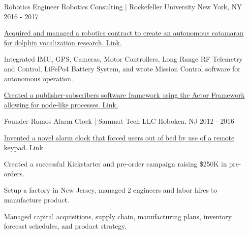 \begin{cventries}
  \cventry
    {Robotics Engineer} %
    {Robotics Consulting | Rockefeller University} %
    {New York, NY} %
    {2016 - 2017} %
    {
      \begin{cvitems} %
          \item {\href{https://paulsammut.com/doku.php/robodolf}
            {Acquired and managed a robotics contract to create an autonomous catamaran for dolphin vocalization research. \color{darkblue}Link.}}
        \item {Integrated IMU, GPS, Cameras, Motor Controllers, Long Range RF Telemetry and Control, 
                    LiFePo4 Battery System, and wrote Mission Control software for autonomous operation.}
        \item {\href{http://bit.ly/2BSBD1c}{Created a publisher-subscribers
            software framework using the Actor Framework allowing for node-like processes. \color{darkblue}Link.}}
      \end{cvitems}
    }

  \cventry
    {Founder} %
    {Ramos Alarm Clock | Sammut Tech LLC} %
    {Hoboken, NJ} %
    {2012 - 2016} %
    {
      \begin{cvitems} %
        \item {\href{http://bit.ly/2NvLgHA}{Invented a novel alarm clock that forced users out of bed by use of a remote keypad. \color{darkblue}Link.}}
        \item {Created a successful Kickstarter and pre-order campaign raising \$250K in pre-orders.}
        \item {Setup a factory in New Jersey, managed 2 engineers and labor hires to manufacture product.}
        \item {Managed capital acquisitions, supply chain, manufacturing plans, inventory forecast schedules, and product strategy.}
      \end{cvitems}
    }


\end{cventries}
